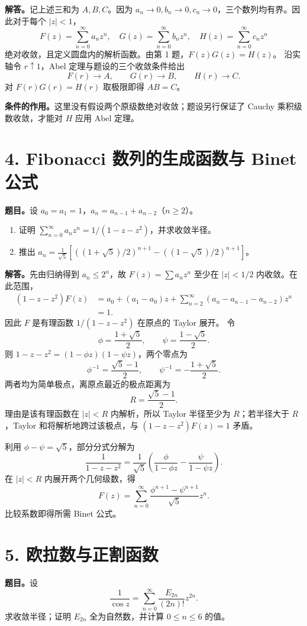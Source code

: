 \documentclass[11pt,a4paper]{ctexart}
\begin{document}
\textbf{解答。}记上述三和为 $A,B,C$。因为 $a_n\to0,b_n\to0,c_n\to0$，三个数列均有界。因此对于每个 $|z|<1$，
\[F(z)=\sum_{n=0}^\infty a_nz^n,\quad G(z)=\sum_{n=0}^\infty b_nz^n,
\quad H(z)=\sum_{n=0}^\infty c_nz^n
\]
绝对收敛，且定义圆盘内的解析函数。由第 1 题，$F(z)G(z)=H(z)$。
沿实轴令 $r\uparrow1$，Abel 定理与题设的三个收敛条件给出
\[F(r)\longrightarrow A,\qquad G(r)\longrightarrow B,\qquad H(r)\longrightarrow C.
\]
对 $F(r)G(r)=H(r)$ 取极限即得 $AB=C$。

\textbf{条件的作用。}这里没有假设两个原级数绝对收敛；题设另行保证了 Cauchy 乘积级数收敛，才能对 $H$ 应用 Abel 定理。

\section*{4. Fibonacci 数列的生成函数与 Binet 公式}
\textbf{题目。}设 $a_0=a_1=1$，$a_n=a_{n-1}+a_{n-2}$（$n\ge2$）。
\begin{enumerate}
\item 证明 $\sum_{n=0}^\infty a_nz^n=1/(1-z-z^2)$，并求收敛半径。
\item 推出 $a_n=\frac1{\sqrt5}\left[((1+\sqrt5)/2)^{n+1}-((1-\sqrt5)/2)^{n+1}\right]$。
\end{enumerate}

\textbf{解答。}先由归纳得到 $a_n\le2^n$，故 $F(z)=\sum a_nz^n$ 至少在 $|z|<1/2$ 内收敛。在此范围，
\begin{align*}
(1-z-z^2)F(z)
&=a_0+(a_1-a_0)z+\sum_{n=2}^\infty(a_n-a_{n-1}-a_{n-2})z^n\\
&=1.
\end{align*}
因此 $F$ 是有理函数 $1/(1-z-z^2)$ 在原点的 Taylor 展开。
令
\[\phi=\frac{1+\sqrt5}{2},\qquad \psi=\frac{1-\sqrt5}{2}.
\]
则 $1-z-z^2=(1-\phi z)(1-\psi z)$，两个零点为
\[\phi^{-1}=\frac{\sqrt5-1}{2},\qquad \psi^{-1}=-\frac{1+\sqrt5}{2}.
\]
两者均为简单极点，离原点最近的极点距离为
\[\boxed{R=\frac{\sqrt5-1}{2}}.
\]
理由是该有理函数在 $|z|<R$ 内解析，所以 Taylor 半径至少为 $R$；若半径大于 $R$，Taylor 和将解析地跨过该极点，与 $(1-z-z^2)F(z)=1$ 矛盾。

利用 $\phi-\psi=\sqrt5$，部分分式分解为
\[\frac1{1-z-z^2}=\frac1{\sqrt5}
\left(\frac{\phi}{1-\phi z}-\frac{\psi}{1-\psi z}\right).
\]
在 $|z|<R$ 内展开两个几何级数，得
\[F(z)=\sum_{n=0}^\infty\frac{\phi^{n+1}-\psi^{n+1}}{\sqrt5}z^n.
\]
比较系数即得所需 Binet 公式。

\section*{5. 欧拉数与正割函数}
\textbf{题目。}设
\[\frac1{\cos z}=\sum_{n=0}^\infty\frac{E_{2n}}{(2n)!}z^{2n}.
\]
求收敛半径；证明 $E_{2n}$ 全为自然数，并计算 $0\le n\le6$ 的值。
\end{document}
